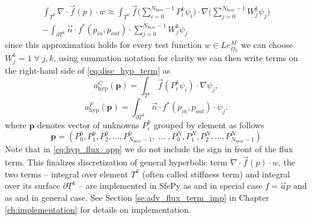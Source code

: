 \begin{multline}
	\label{eq:disc_hyp_term}
	\int_{T^k} \nabla\cdot \vec{f}(p)\cdot w \approx \int_{T^k} 
	\vec{f}\Big(\sum\limits_{i=0}^{N_{base} - 1} 
	P_i^k\psi_i\Big)\cdot\nabla\Big(\sum\limits_{j=0}^{N_{base} - 1} 
	W_j^k\psi_j\Big)\\	
	-\int_{\partial{T^k}} \vec{n} \cdot f^{*} (p_{in}, p_{out})\cdot 
	\sum\limits_{j=0}^{N_{base} - 1} W_j^k\psi_j
\end{multline}
since this approximation holds for every test function $w \in 
Le_{\Omega_h}^{M}$ we can choose $W_j^k = 1 \; \forall \; 
j, k$, using summation notation for clarity we can then write terms on the  right-hand 
side of \eqref{eq:disc_hyp_term} as 
\begin{equation}\label{eq:hyp_stiff_app}
		a^C_\mathrm{hyp}(\mathbf{p}) = \int_{T^k} \vec{f}(P_i^k\psi_i)\cdot\nabla\psi_j, 
\end{equation}
\begin{equation}\label{eq:hyp_flux_app}
	a^F_\mathrm{hyp}(\mathbf{p}) = \int_{\partial{T^k}} \vec{n} \cdot f^{*} (p_{in}, 
	p_{out})\cdot\psi_j.
\end{equation}
where $\mathbf{p}$ denotes vector of unknowns $P^k_i$ grouped by element as follows
\begin{equation}
	\mathbf{p} = \left(P^0_0, P^0_1, P^0_2, \ldots, P^0_{N_{base}-1}, \; \ldots \; ,
	P^{N}_0, P^{N}_1, P^{N}_2, \ldots, P^{N}_{N_{base} - 1}  \right)
\end{equation}
Note that in \eqref{eq:hyp_flux_app} we do not include the sign in front of the flux term.
This finalizes discretization of general hyperbolic term $\nabla\cdot\vec{f}(p) 
\cdot w$, the two terms -- integral over element $T^k$ (often called stiffness 
term) and integral over its surface $\partial T^k$ -- are implemented in SfePy 
as  and  in special 
case $f = \vec{a}p$ and as  and 
 in general case. See Section 
\ref{se:adv_flux_term_imp} in Chapter \ref{ch:implementation} for details on 
implementation.


